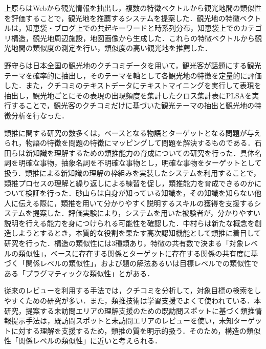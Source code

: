 \documentclass{deimj}
\begin{document}
上原ら\cite{Codd03}はWebから観光情報を抽出し，複数の特徴ベクトルから観光地間の類似性を評価することで，観光地を推薦するシステムを提案した．観光地の特徴ベクトルは，知恵袋・ブログ上での共起キーワードと時系列分布，知恵袋上でのカテゴリ構造，観光地周辺施設，地図画像から生成した．これらの特徴ベクトルから観光地間の類似度の測定を行い，類似度の高い観光地を推薦した．

野守ら\cite{Codd04}は日本全国の観光地のクチコミデータを用いて，観光客が話題にする観光テーマを確率的に抽出し，そのテーマを軸として各観光地の特徴を定量的に評価した．また，クチコミのテキストデータにテキストマイニングを実行して表現を抽出し，観光地ごとにその表現の出現頻度を集計したクロス集計表にPLSAを実行することで，観光客のクチコミだけに基づいた観光テーマの抽出と観光地の特徴分析を行なった．

類推に関する研究の数多くは，ベースとなる物語とターゲットとなる問題が与えられ，物語の特徴を問題の特徴にマッピングして問題を解決するものである\cite{Codd05}．石田ら\cite{Codd06}は新知識を理解するための類推能力の育成についての研究を行った．具体名詞を明確な事物，抽象名詞を不明確な事物とし，明確な事物をターゲットとして扱う．類推による新知識の理解の枠組みを実装したシステムを利用することで，類推プロセスの理解と繰り返しによる練習を促し，類推能力を育成できるのかについて検証を行った．砂山ら\cite{Codd07}は自身が知っている知識を，その知識を知らない他人に伝える際に，類推を用いて分かりやすく説明するスキルの獲得を支援するシステムを提案した．評価実験により，システムを用いた被験者が，分かりやすい説明を行える能力を身につけられる可能性を確認した．中村ら\cite{Codd08}は新たな概念を創造しようとするとき，本質的な役割を果たす高次認知機能として類推に着目して研究を行った．構造の類似性には3種類あり，特徴の共有数で決まる「対象レベルの類似性」，ベースに存在する関係とターゲットに存在する関係の共有度に基づく「関係レベルの類似性」，および題の解法あるいは目標レベルでの類似性である「プラグマティックな類似性」とがある\cite{Codd09}．

従来のレビューを利用する手法では，クチコミを分析して，対象目標の検索をしやすくための研究が多い．また，類推技術は学習支援でよくて使われている．本研究，提案する未訪問エリアの理解支援のための既訪問スポットに基づく類推情報提示手法は，既訪問スポットと未訪問エリアのレビューを使い，未知ターゲットに対する理解を支援するため，類推の質を明示的扱う．そのため，構造の類似性「関係レベルの類似性」に近いと考えられる．


\end{document}
